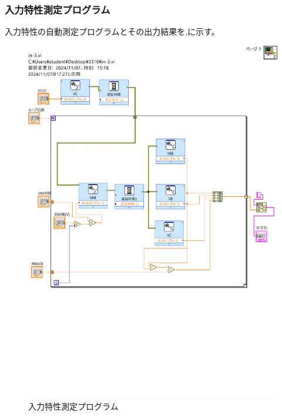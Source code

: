 \documentclass[11pt,dvipdfmx]{jarticle}
\begin{document}
		\subsubsection{入力特性測定プログラム}
		入力特性の自動測定プログラムとその出力結果を,に示す。
		\begin{figure}[H]
			\centering
			\includegraphics[scale=0.3]{fig/in-3.pdf}
			\caption{入力特性測定プログラム}
			\label{fig:入力特性測定プログラム}
		\end{figure}
\end{document}

